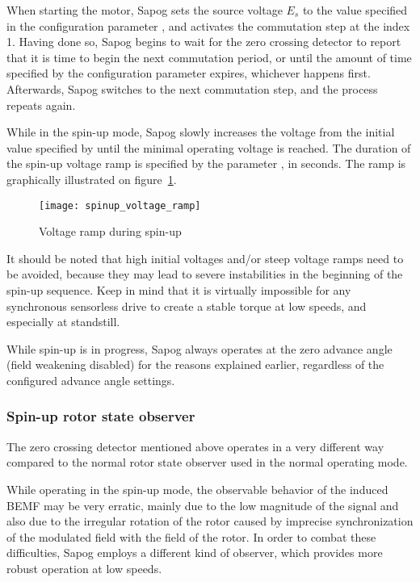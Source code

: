 \documentclass{zubaxdoc}
\begin{document}
When starting the motor, Sapog sets the source voltage $E_s$ to the value specified in the
configuration parameter , and activates the commutation step at the index 1.
Having done so, Sapog begins to wait for the zero crossing detector to report that it is time to
begin the next commutation period, or until the amount of time specified by the configuration parameter
 expires, whichever happens first.
Afterwards, Sapog switches to the next commutation step, and the process repeats again.

While in the spin-up mode, Sapog slowly increases the voltage from the initial value specified
by  until the minimal operating voltage  is reached.
The duration of the spin-up voltage ramp is specified by the parameter ,
in seconds.
The ramp is graphically illustrated on figure~\ref{spinup_voltage_ramp}.

\begin{figure}[hbt]
	\centering
	\texttt{[image: spinup\_voltage\_ramp]}
	\caption{Voltage ramp during spin-up
		\label{spinup_voltage_ramp}}
\end{figure}

It should be noted that high initial voltages and/or steep voltage ramps need to be avoided,
because they may lead to severe instabilities in the beginning of the spin-up sequence.
Keep in mind that it is virtually impossible for any synchronous sensorless drive to create a stable
torque at low speeds, and especially at standstill.

While spin-up is in progress, Sapog always operates at the zero advance angle
(field weakening disabled) for the reasons explained earlier,
regardless of the configured advance angle settings.

\subsubsection{Spin-up rotor state observer}

The zero crossing detector mentioned above operates in a very different way compared to the
normal rotor state observer used in the normal operating mode.

While operating in the spin-up mode, the observable behavior of the induced BEMF may be very erratic,
mainly due to the low magnitude of the signal and also due to the irregular rotation of the rotor caused by
imprecise synchronization of the modulated field with the field of the rotor.
In order to combat these difficulties, Sapog employs a different kind of observer, which provides
more robust operation at low speeds.
\end{document}
